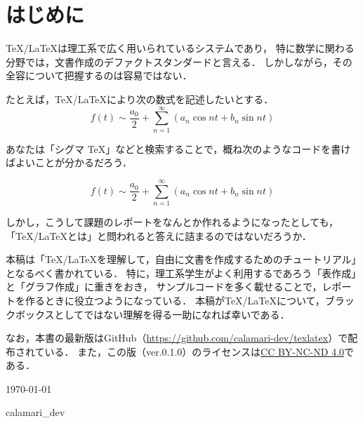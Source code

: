 \documentclass[../index]{subfiles}
\begin{document}
\chapter{はじめに}
\TeX /\LaTeX は理工系で広く用いられているシステムであり，
特に数学に関わる分野では，文書作成のデファクトスタンダードと言える．
しかしながら，その全容について把握するのは容易ではない．

たとえば，\TeX /\LaTeX により次の数式を記述したいとする．
\[
  f(t) \sim \frac{a_0}{2} + \sum_{n=1}^\infty (a_n\cos nt + b_n\sin nt)
\]

あなたは「シグマ TeX」などと検索することで，概ね次のようなコードを書けばよいことが分かるだろう．
\begin{codeblock}
\[
  f(t) \sim \frac{a_0}{2} + \sum_{n=1}^\infty (a_n\cos nt + b_n\sin nt)
\]
\end{codeblock}

しかし，こうして課題のレポートをなんとか作れるようになったとしても，
「\TeX /\LaTeX とは」と問われると答えに詰まるのではないだろうか．

本稿は「\TeX /\LaTeX を理解して，自由に文書を作成するためのチュートリアル」となるべく書かれている．
特に，理工系学生がよく利用するであろう「表作成」と「グラフ作成」に重きをおき，
サンプルコードを多く載せることで，レポートを作るときに役立つようになっている．
本稿が\TeX /\LaTeX について，ブラックボックスとしてではない理解を得る一助になれば幸いである．

なお，本書の最新版はGitHub（\url{https://github.com/calamari-dev/texlatex}）で配布されている．
また，この版（ver.0.1.0）のライセンスは\href{https://creativecommons.org/licenses/by-nc-nd/4.0/deed.ja}{CC BY-NC-ND 4.0}である．

\begin{flushright}
  \today

  calamari\_dev
\end{flushright}
\end{document}
